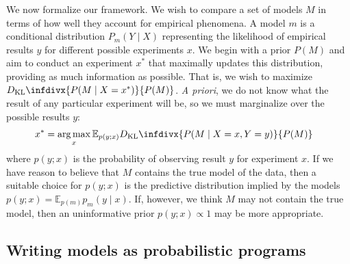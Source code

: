 \documentclass{article}
\newcommand{\dkl}{D_\mathrm{KL}\infdivx}
\DeclareMathOperator*{\argmax}{arg\,max}
\begin{document}
We now formalize our framework.
We wish to compare a set of models $M$ in terms of how well they account for empirical phenomena.
A model $m$ is a conditional distribution $P_m(Y \mid X)$ representing the likelihood of empirical results $y$ for different possible experiments $x$.
We begin with a prior $P(M)$ and aim to conduct an experiment $x^*$ that maximally updates this distribution, providing as much information as possible.
That is, we wish to maximize $\dkl{ P(M \mid X = x^*) }{ P(M) }$.
\emph{A priori}, we do not know what the result of any particular experiment will be, so we must marginalize over the possible results $y$:
\begin{align}
  x^{*} &= \argmax_{x} {\mathbb E}_{p(y ; x)} \dkl{ P(M \mid X = x, Y = y) }{ P(M) }  \label{eq:oed}
\end{align}
where $p(y ; x)$ is the probability of observing result $y$ for experiment $x$.
If we have reason to believe that $M$ contains the true model of the data, then a suitable choice for $p(y ; x)$ is the predictive distribution implied by the models $p(y ; x) = {\mathbb E}_{p(m)} p_m(y \mid x)$.
If, however, we think $M$ may not contain the true model, then an uninformative prior $p(y ; x) \propto 1$ may be more appropriate.

\subsection{Writing models as probabilistic programs}
\end{document}
